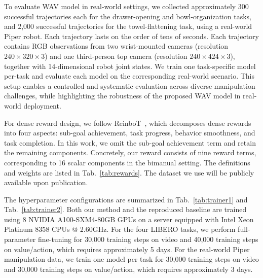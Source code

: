 
\label{appendix:Implementation_Details}
To evaluate WAV model in real-world settings, we collected approximately 300 successful trajectories each for the drawer-opening and bowl-organization tasks, and 2,000 successful trajectories for the towel-flattening task, using a real-world Piper robot. 
Each trajectory lasts on the order of tens of seconds. Each trajectory contains RGB observations from two wrist-mounted cameras (resolution $240\times320\times3$) and one third-person top camera (resolution $240\times424\times3$), together with 14-dimensional robot joint states.
We train one task-specific model per-task and evaluate each model on the corresponding real-world scenario.
This setup enables a controlled and systematic evaluation across diverse manipulation challenges, while highlighting the robustness of the proposed WAV model in real-world deployment.

For dense reward design, we follow ReinboT~\citep{zhang2025reinbot}, which decomposes dense rewards into four aspects: sub-goal achievement, task progress, behavior smoothness, and task completion. In this work, we omit the sub-goal achievement term and retain the remaining components. Concretely, our reward consists of nine reward terms, corresponding to 16 scalar components in the bimanual setting. The definitions and weights are listed in Tab.~\ref{tab:rewards}. The dataset we use will be publicly available upon publication.

The hyperparameter configurations are summarized in Tab.~\ref{tab:trainer1} and Tab.~\ref{tab:trainer2}. Both our method and the reproduced baseline are trained using 8 NVIDIA A100-SXM4-80GB GPUs on a server equipped with Intel Xeon Platinum 8358 CPUs @ 2.60GHz. For the four LIBERO tasks, we perform full-parameter fine-tuning for 30,000 training steps on video and 40,000 training steps on value/action, which requires approximately 5 days. For the real-world Piper manipulation data, we train one model per task for 30,000 training steps on video and 30,000 training steps on value/action, which requires approximately 3 days.

